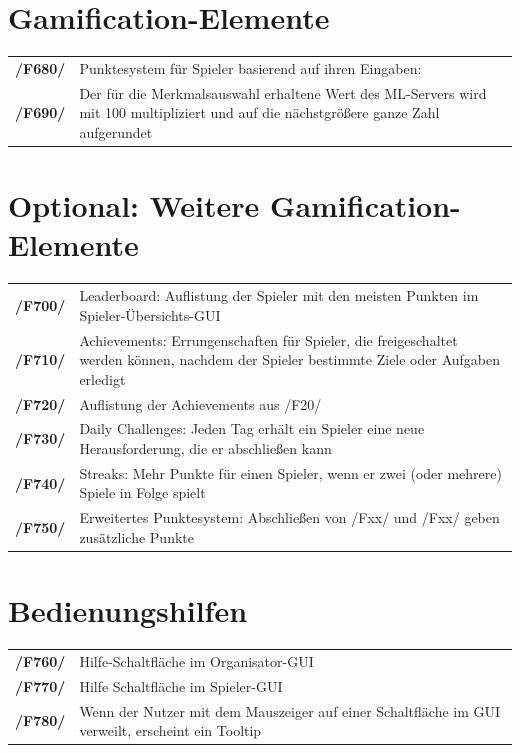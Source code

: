 \documentclass[a4paper]{scrreprt}
\begin{document}
    \section{Gamification-Elemente} %
    \label{sec:Gamification-Elemente}
    \begin{tabularx}{\linewidth}{@{}>{\bfseries}l@{\hspace{.5em}}X@{}}
    /F680/ & Punktesystem für \Gls{Spieler} basierend auf ihren Eingaben: \\
    /F690/ & Der für die Merkmalsauswahl erhaltene Wert des \Gls{ML-Server}s wird mit 100 multipliziert und
        auf die nächstgrößere ganze Zahl aufgerundet \\
    \end{tabularx}

    \section{Optional: Weitere Gamification-Elemente}
    \label{sec:Optionale Gamification-Elemente}
    \begin{tabularx}{\linewidth}{@{}>{\bfseries}l@{\hspace{.5em}}X@{}}
	/F700/ & Leaderboard: Auflistung der \Gls{Spieler} mit den meisten Punkten im Spieler-Übersichts-GUI \\
	/F710/ & Achievements: Errungenschaften für \Gls{Spieler}, die freigeschaltet werden können, nachdem der Spieler bestimmte Ziele oder Aufgaben erledigt \\
	/F720/ & Auflistung der Achievements aus /F20/ \\ %
	/F730/ & Daily Challenges: Jeden Tag erhält ein \Gls{Spieler} eine neue Herausforderung, die er abschließen kann \\
	/F740/ & Streaks: Mehr Punkte für einen \Gls{Spieler}, wenn er zwei (oder mehrere) Spiele in Folge spielt \\
	/F750/ & Erweitertes Punktesystem: Abschließen von /Fxx/ und /Fxx/ geben zusätzliche Punkte \\
    \end{tabularx}
    
    \section{Bedienungshilfen}
	\begin{tabularx}{\linewidth}{@{}>{\bfseries}l@{\hspace{.5em}}X@{}}
	/F760/ & Hilfe-Schaltfläche im Organisator-GUI \\ 
	/F770/ & Hilfe Schaltfläche im Spieler-GUI \\ %
	/F780/ & Wenn der Nutzer mit dem Mauszeiger auf einer Schaltfläche im GUI verweilt, erscheint ein Tooltip \\ %
	\end{tabularx}
\end{document}
